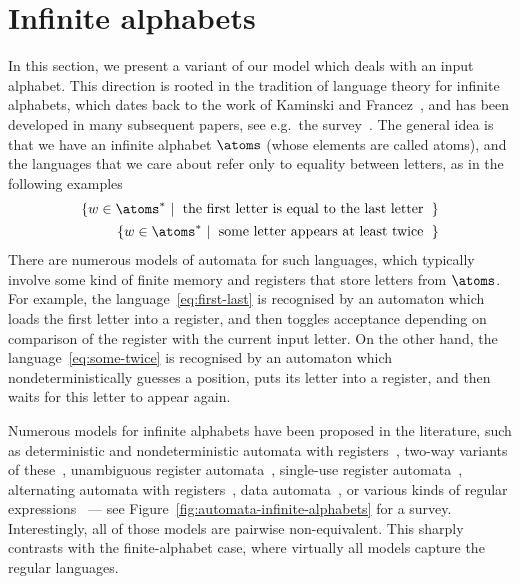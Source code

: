 \section{Infinite alphabets}
\label{sec:infinite-alphabets}


In this section, we present a variant of our model which deals with an input alphabet. This direction is rooted in the tradition of language theory for infinite alphabets, which dates back to the work of Kaminski and Francez~\cite{kaminskiFiniteMemoryAutomata1994}, and has been developed in many subsequent papers, see e.g.~the survey~\cite{bojanczykOrbitFiniteSetsTheir2017}. The general idea is that we have an infinite alphabet $\atoms$ (whose elements are called atoms), and the languages that we care about refer only to equality between letters, as in the following examples
\begin{align}
\setbuild{ w \in \atoms^*}{the first letter is equal to the last letter}
\label{eq:first-last}
\\
\setbuild{ w \in \atoms^*}{some letter appears at least twice}
\label{eq:some-twice}
\end{align}
There are numerous models of automata for such languages, which typically involve some kind of finite memory and registers that store letters from $\atoms$. For example, the language~\eqref{eq:first-last} is recognised by an automaton which loads the first letter into a register, and then toggles acceptance depending on comparison of the register with the current input letter. On the other hand, the language~\eqref{eq:some-twice} is recognised by an automaton which nondeterministically guesses a position, puts its letter into a register, and then waits for this letter to appear again. 

Numerous models for infinite alphabets have been proposed in the literature, such as deterministic and nondeterministic automata with registers~\cite[Section 2]{kaminskiFiniteMemoryAutomata1994}, two-way variants of these~\cite[Definition 2.1]{nevenFiniteStateMachines2004}, unambiguous register automata~\cite[Section 5]{colcombet2015unambiguity}, single-use register automata~\cite[Definition 3]{bojanczykstefanski2020}, alternating automata with registers~\cite[Section 2.5]{DBLP:journals/tocl/DemriL09}, data automata~\cite[Section 4.2]{bojanczykTwovariableLogicData2011}, or various kinds of regular expressions~\cite{regexpKaminskiTan2004,regexpLibkin2015,KleeneNominal2019} --- see Figure~\ref{fig:automata-infinite-alphabets} for a survey. Interestingly, all of those models are pairwise non-equivalent. This sharply contrasts with the finite-alphabet case, where virtually all models capture the regular languages.

